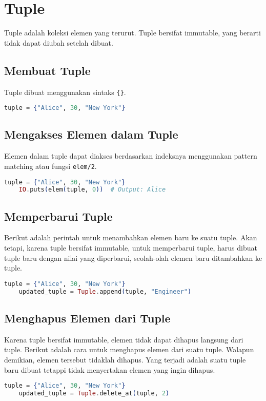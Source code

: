 \section{Tuple}
Tuple adalah koleksi elemen yang terurut. Tuple bersifat immutable, yang berarti tidak dapat diubah setelah dibuat.

\subsection{Membuat Tuple}
Tuple dibuat menggunakan sintaks \texttt{\{\}}.
\begin{lstlisting}[language=Elixir]
	tuple = {"Alice", 30, "New York"}
\end{lstlisting}

\subsection{Mengakses Elemen dalam Tuple}
Elemen dalam tuple dapat diakses berdasarkan indeksnya menggunakan pattern matching atau fungsi \texttt{elem/2}.
\begin{lstlisting}[language=Elixir]
	tuple = {"Alice", 30, "New York"}
	IO.puts(elem(tuple, 0))  # Output: Alice
\end{lstlisting}

\subsection{Memperbarui Tuple}
Berikut adalah perintah untuk menambahkan elemen baru ke suatu tuple. Akan tetapi, karena tuple bersifat immutable, untuk memperbarui tuple, harus dibuat tuple baru dengan nilai yang diperbarui, seolah-olah elemen baru ditambahkan ke tuple.
\begin{lstlisting}[language=Elixir]
	tuple = {"Alice", 30, "New York"}
	updated_tuple = Tuple.append(tuple, "Engineer")
\end{lstlisting}

\subsection{Menghapus Elemen dari Tuple}
Karena tuple bersifat immutable, elemen tidak dapat dihapus langsung dari tuple. Berikut adalah cara untuk menghapus elemen dari suatu tuple. Walapun demikian, elemen tersebut tidaklah dihapus. Yang terjadi adalah suatu tuple baru dibuat tetappi tidak menyertakan elemen yang ingin dihapus.

\begin{lstlisting}[language=Elixir]
	tuple = {"Alice", 30, "New York"}
	updated_tuple = Tuple.delete_at(tuple, 2)
\end{lstlisting}




